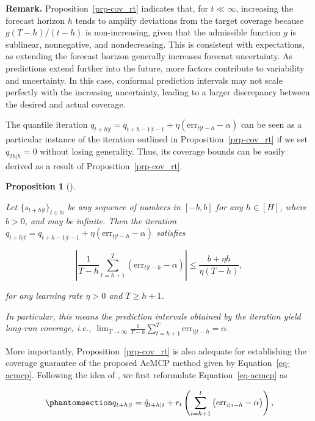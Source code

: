 \documentclass[
  11pt,
  a4paper,
]{article}
\theoremstyle{plain}
\newtheorem{proposition}{Proposition}[section]
\theoremstyle{remark}
\begin{document}
\textbf{Remark.} Proposition~\ref{prp-cov_rt} indicates that, for
\(t \ll \infty\), increasing the forecast horizon \(h\) tends to amplify
deviations from the target coverage because \(g(T-h)/(t-h)\) is
non-increasing, given that the admissible function \(g\) is sublinear,
nonnegative, and nondecreasing. This is consistent with expectations, as
extending the forecast horizon generally increases forecast uncertainty.
As predictions extend further into the future, more factors contribute
to variability and uncertainty. In this case, conformal prediction
intervals may not scale perfectly with the increasing uncertainty,
leading to a larger discrepancy between the desired and actual coverage.

The quantile iteration
\(q_{t+h|t}=q_{t+h-1|t-1}+\eta \left(\mathrm{err}_{t|t-h}-\alpha\right)\)
can be seen as a particular instance of the iteration outlined in
Proposition~\ref{prp-cov_rt} if we set \(q_{2h|h}=0\) without losing
generality. Thus, its coverage bounds can be easily derived as a result
of Proposition~\ref{prp-cov_rt}.

\begin{proposition}[]\protect\hypertarget{prp-cov_qt}{}\label{prp-cov_qt}

Let \(\{s_{t+h|t}\}_{t\in\mathbb{N}}\) be any sequence of numbers in
\([-b, b]\) for any \(h\in[H]\), where \(b>0\), and may be infinite.
Then the iteration
\(q_{t+h|t}=q_{t+h-1|t-1}+\eta \left(\mathrm{err}_{t|t-h}-\alpha\right)\)
satisfies

\[
\left|\frac{1}{T-h}\sum_{t=h+1}^{T}\left(\mathrm{err}_{t|t-h}-\alpha\right)\right| \leq \frac{b + \eta h}{\eta\left(T-h\right)},
\]

for any learning rate \(\eta > 0\) and \(T \geq h+1\).

In particular, this means the prediction intervals obtained by the
iteration yield long-run coverage, i.e.,
\(\lim _{T \rightarrow \infty} \frac{1}{T-h} \sum_{t=h+1}^T \mathrm{err}_{t|t-h} = \alpha\).

\end{proposition}

More importantly, Proposition~\ref{prp-cov_rt} is also adequate for
establishing the coverage guarantee of the proposed AcMCP method given
by Equation~\ref{eq-acmcp}. Following the idea of
\textcite{angelopoulos2024}, we first reformulate
Equation~\ref{eq-acmcp} as

\begin{equation}\phantomsection\label{eq-acmcp_1}{
q_{t+h|t}=\hat{q}_{t+h|t}+r_t\left(\sum_{i=h+1}^t \left(\mathrm{err}_{i|i-h}-\alpha\right)\right),
}\end{equation}
\end{document}
